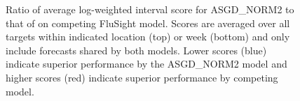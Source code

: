 \begin{figure}[hbt!]
\begin{adjustwidth}{-1.2cm}{-1.5cm}
    \centering
    \end{adjustwidth}
    \caption{Ratio of average log-weighted interval score for ASGD\_NORM2 
    to that of on competing FluSight model. Scores are averaged
    over all targets within indicated location (top) or week (bottom) and 
    only include forecasts shared by both models. Lower scores (blue) indicate
    superior performance by the ASGD\_NORM2 model and higher scores (red)
    indicate superior performance by competing model.}
    \label{fig:state_and_date_lwis}
    
\end{figure}



